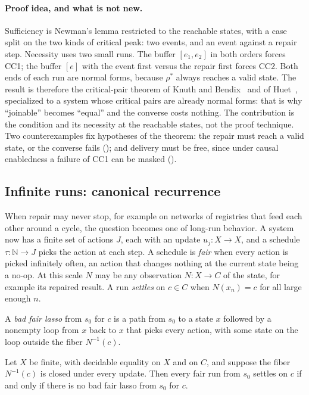 \paragraph{Proof idea, and what is not new.}
Sufficiency is Newman's lemma restricted to the reachable states, with a case split on the two kinds
of critical peak: two events, and an event against a repair step. Necessity uses two small runs. The
buffer $[e_1, e_2]$ in both orders forces CC1; the buffer $[e]$ with the event first versus the repair
first forces CC2. Both ends of each run are normal forms, because $\rho^{*}$ always reaches a valid
state. The result is therefore the critical-pair theorem of Knuth and Bendix~\cite{knuthbendix1970}
and of Huet~\cite{huet1980}, specialized to a system whose critical pairs are already normal forms: that is
why ``joinable'' becomes ``equal'' and the converse costs nothing. The contribution is the condition
and its necessity at the reachable states, not the proof technique. Two counterexamples fix
hypotheses of the theorem: the repair must reach a valid state, or the converse fails
(); and delivery must be free, since under causal enabledness a failure of CC1
can be masked ().

\subsection{Infinite runs: canonical recurrence}\label{sec:main-recurrence}

When repair may never stop, for example on networks of registries that feed each other around a
cycle, the question becomes one of long-run behavior. A system now has a finite set of actions $J$,
each with an update $u_j : X \to X$, and a schedule $\tau : \mathbb{N} \to J$ picks the action at
each step. A schedule is \emph{fair} when every action is picked infinitely often, an action that
changes nothing at the current state being a no-op. At this scale $N$ may be any observation $N : X \to C$ of the state, for example its repaired
result. A run \emph{settles} on $c \in C$ when $N(x_n) = c$ for all large enough $n$.

A \emph{bad fair lasso} from $s_0$ for $c$ is a path from $s_0$ to a state $x$ followed by a
nonempty loop from $x$ back to $x$ that picks every action, with some state on the loop outside the
fiber $N^{-1}(c)$.

\begin{theorem}\label{thm:c1}
Let $X$ be finite, with decidable equality on $X$ and on $C$, and suppose the fiber $N^{-1}(c)$ is closed under every update. Then every fair run
from $s_0$ settles on $c$ if and only if there is no bad fair lasso from $s_0$ for $c$.
\end{theorem}

